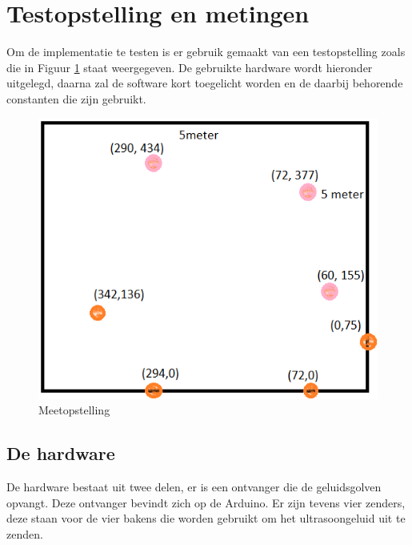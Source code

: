 \documentclass{article}
\begin{document}
\section{Testopstelling en metingen}
Om de implementatie te testen is er gebruik gemaakt van een testopstelling zoals die in Figuur \ref{Meetopstelling} staat weergegeven. De gebruikte hardware wordt hieronder uitgelegd, daarna zal de software kort toegelicht worden en de daarbij behorende constanten die zijn gebruikt.
\begin{figure}[h] 
\centering\includegraphics[scale=0.5]{Meetopstelling.png}
\caption{Meetopstelling}
\label{Meetopstelling}
\end{figure}

\subsection{De hardware}
De hardware bestaat uit twee delen, er is een ontvanger die de geluidsgolven opvangt. Deze ontvanger bevindt zich op de Arduino. Er zijn tevens vier zenders, deze staan voor de vier bakens die worden gebruikt om het ultrasoongeluid uit te zenden. 
\end{document}
